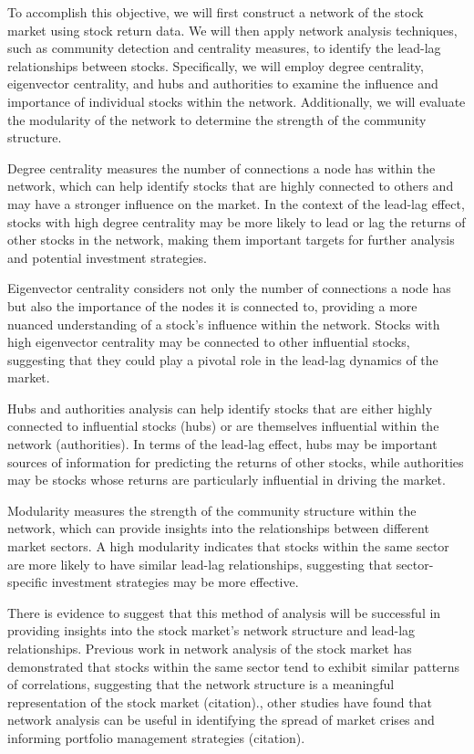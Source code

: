 \documentclass{article}
\begin{document}
To accomplish this objective, we will first construct a network of the stock market using stock return data.  We will then apply network analysis techniques, such as community detection and centrality measures, to identify the lead-lag relationships between stocks. Specifically, we will employ degree centrality, eigenvector centrality, and hubs and authorities to examine the influence and importance of individual stocks within the network. Additionally, we will evaluate the modularity of the network to determine the strength of the community structure.

Degree centrality measures the number of connections a node has within the network, which can help identify stocks that are highly connected to others and may have a stronger influence on the market. In the context of the lead-lag effect, stocks with high degree centrality may be more likely to lead or lag the returns of other stocks in the network, making them important targets for further analysis and potential investment strategies.

Eigenvector centrality considers not only the number of connections a node has but also the importance of the nodes it is connected to, providing a more nuanced understanding of a stock's influence within the network. Stocks with high eigenvector centrality may be connected to other influential stocks, suggesting that they could play a pivotal role in the lead-lag dynamics of the market.

Hubs and authorities analysis can help identify stocks that are either highly connected to influential stocks (hubs) or are themselves influential within the network (authorities). In terms of the lead-lag effect, hubs may be important sources of information for predicting the returns of other stocks, while authorities may be stocks whose returns are particularly influential in driving the market.

Modularity measures the strength of the community structure within the network, which can provide insights into the relationships between different market sectors. A high modularity indicates that stocks within the same sector are more likely to have similar lead-lag relationships, suggesting that sector-specific investment strategies may be more effective.

There is evidence to suggest that this method of analysis will be successful in providing insights into the stock market's network structure and lead-lag relationships. Previous work in network analysis of the stock market has demonstrated that stocks within the same sector tend to exhibit similar patterns of correlations, suggesting that the network structure is a meaningful representation of the stock market (citation)., other studies have found that network analysis can be useful in identifying the spread of market crises and informing portfolio management strategies (citation).
\end{document}
